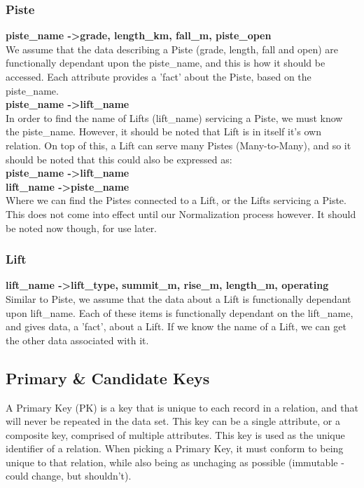 \documentclass[11pt]{scrartcl} %
\begin{document}
\subsubsection{Piste}
\textbf{piste\_name -\textgreater \space grade, length\_km, fall\_m, piste\_open}
\\[0.1cm]
We assume that the data describing a Piste (grade, length, fall and open) are functionally dependant upon the piste\_name, and this is how it should be accessed. Each attribute provides a 'fact' about the Piste, based on the piste\_name.\\[0.1cm]
\textbf{piste\_name -\textgreater \space lift\_name}
\\[0.1cm]
In order to find the name of Lifts (lift\_name) servicing a Piste, we must know the piste\_name. However, it should be noted that Lift is in itself it's own relation. On top of this, a Lift can serve many Pistes (Many-to-Many), and so it should be noted that this could also be expressed as:\\[0.1cm]
\textbf{piste\_name -\textgreater \space lift\_name}\\
\textbf{lift\_name -\textgreater \space piste\_name}\\
Where we can find the Pistes connected to a Lift, or the Lifts servicing a Piste. This does not come into effect until our Normalization process however. It should be noted now though, for use later.

\subsubsection{Lift}
\textbf{lift\_name -\textgreater \space lift\_type, summit\_m, rise\_m, length\_m, operating}
\\[0.2cm]
Similar to Piste, we assume that the data about a Lift is functionally dependant upon lift\_name. Each of these items is functionally dependant on the lift\_name, and gives data, a 'fact', about a Lift. If we know the name of a Lift, we can get the other data associated with it.

\subsection{Primary \& Candidate Keys}
A Primary Key (PK) is a key that is unique to each record in a relation, and that will never be repeated in the data set. This key can be a single attribute, or a composite key, comprised of multiple attributes. This key is used as the unique identifier of a relation. When picking a Primary Key, it must conform to being unique to that relation, while also being as unchaging as possible (immutable - could change, but shouldn't).
\end{document}

